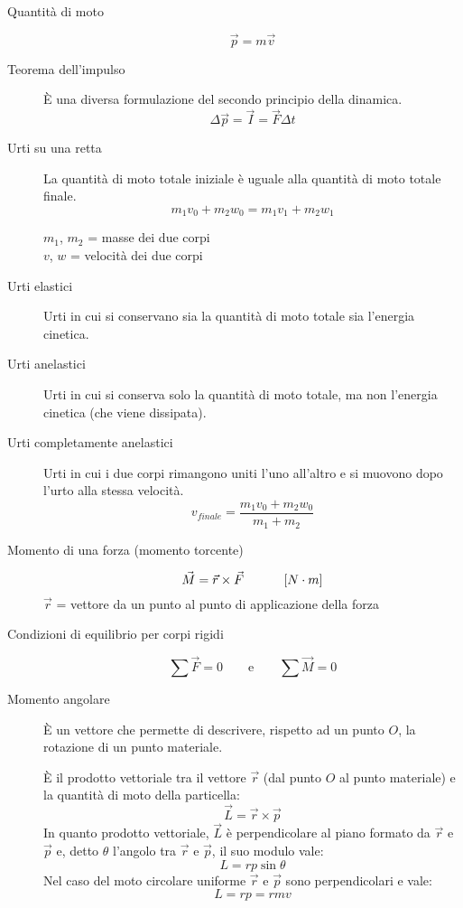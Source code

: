 \documentclass[a4paper,11pt,italian]{article}
\begin{document}
\begin{description}
  \item[Quantità di moto] 
  \[ \vec{p} = m \vec{v}\] 
  
  \item[Teorema dell'impulso] 
  È una diversa formulazione del secondo principio della dinamica.
  \[ \Delta \vec{p} = \vec{I} = \vec{F} \Delta t \]
  
  \item[Urti su una retta] 
  La quantità di moto totale iniziale è uguale alla quantità di moto totale finale.
  \[ m_1 v_0 + m_2 w_0 = m_1 v_1 + m_2 w_1 \]
  \begin{multicols}{2}
  $ m_1 $, $ m_2 $ = masse dei due corpi\\
  $ v $, $ w $ = velocità dei due corpi
  \end{multicols}
  
  \item[Urti elastici] 
  Urti in cui si conservano sia la quantità di moto totale sia l'energia cinetica.
  
  \item[Urti anelastici] 
  Urti in cui si conserva solo la quantità di moto totale, ma non l'energia cinetica (che viene dissipata).
  
  \item[Urti completamente anelastici] 
  Urti in cui i due corpi rimangono uniti l'uno all'altro e si muovono dopo l'urto alla stessa velocità.
  \[ v_{finale} = \frac{m_1 v_0 + m_2 w_0}{m_1 + m_2} \]
  
  \item[Momento di una forza (momento torcente)]
  \[ \vec{M} = \vec{r} \times \vec{F} \hspace*{3em} \left[ N \cdot m \right] \]
  $ \vec{r} $ = vettore da un punto al punto di applicazione della forza
  
  \item[Condizioni di equilibrio per corpi rigidi]
  \[ \sum \vec{F} = 0 \quad\quad\textrm{e}\quad\quad \sum \vec{M} = 0 \]
  
  \item[Momento angolare] 
  È un vettore che permette di descrivere, rispetto ad un punto $ O $, la rotazione di un punto materiale.
  
  È il prodotto vettoriale tra il vettore $ \vec{r} $ (dal punto $ O $ al punto materiale) e la quantità di moto della particella:
  \[ \vec{L} = \vec{r} \times \vec{p} \]
  In quanto prodotto vettoriale, $ \vec{L} $ è perpendicolare al piano formato da $ \vec{r} $ e $ \vec{p} $ e, detto $ \theta $ l'angolo tra $ \vec{r} $ e $ \vec{p} $, il suo modulo vale: 
  \[ L = rp\sin\theta \]
  Nel caso del moto circolare uniforme $ \vec{r} $ e $ \vec{p} $ sono perpendicolari e vale:
  \[ L = rp = rmv \]
  

\end{description}
\end{document}
